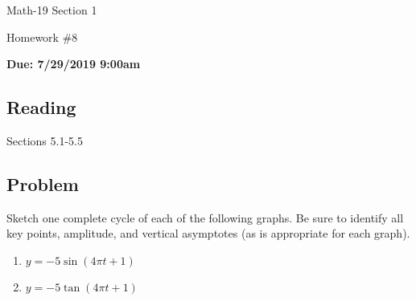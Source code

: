 \documentclass[letterpaper,12pt,fleqn]{article}
\begin{document}
\begin{center}
  \large
  Math-19 Section 1

  \Large
  Homework \#8

  \large
  \textbf{Due: 7/29/2019 9:00am}
\end{center}

\subsection*{Reading}

Sections 5.1-5.5

\subsection*{Problem}

Sketch one complete cycle of each of the following graphs.  Be sure to identify all key points, amplitude, and
vertical asymptotes (as is appropriate for each graph).
\begin{enumerate}
\item \(y=-5\sin(4\pi t+1)\)
\item \(y=-5\tan(4\pi t+1)\)
\end{enumerate}
\end{document}
